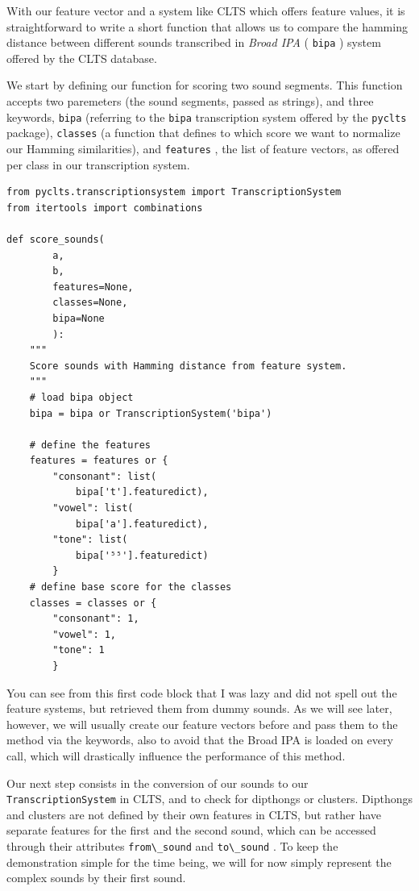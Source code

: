 \documentclass[
  a4paper,
  14pt,
  oneside,
  tablecaptionabove
]{scrbook}
\newcommand{\passthrough}[1]{#1}
\begin{document}
With our feature vector and a system like CLTS which offers feature
values, it is straightforward to write a short function that allows us
to compare the hamming distance between different sounds transcribed in
\emph{Broad IPA} ( \passthrough{\lstinline!bipa!} ) system offered by
the CLTS database.

We start by defining our function for scoring two sound segments. This
function accepts two paremeters (the sound segments, passed as strings),
and three keywords, \passthrough{\lstinline!bipa!} (referring to the
\passthrough{\lstinline!bipa!} transcription system offered by the
\passthrough{\lstinline!pyclts!} package),
\passthrough{\lstinline!classes!} (a function that defines to which
score we want to normalize our Hamming similarities), and
\passthrough{\lstinline!features!} , the list of feature vectors, as
offered per class in our transcription system.

\begin{lstlisting}
from pyclts.transcriptionsystem import TranscriptionSystem
from itertools import combinations

def score_sounds(
        a,
        b,
        features=None,
        classes=None,
        bipa=None
        ):
    """
    Score sounds with Hamming distance from feature system.
    """
    # load bipa object
    bipa = bipa or TranscriptionSystem('bipa')

    # define the features
    features = features or {
        "consonant": list(
            bipa['t'].featuredict),
        "vowel": list(
            bipa['a'].featuredict),
        "tone": list(
            bipa['⁵⁵'].featuredict)
        }
    # define base score for the classes
    classes = classes or {
        "consonant": 1,
        "vowel": 1,
        "tone": 1
        }
\end{lstlisting}

You can see from this first code block that I was lazy and did not spell
out the feature systems, but retrieved them from dummy sounds. As we
will see later, however, we will usually create our feature vectors
before and pass them to the method via the keywords, also to avoid that
the Broad IPA is loaded on every call, which will drastically influence
the performance of this method.

Our next step consists in the conversion of our sounds to our
\passthrough{\lstinline!TranscriptionSystem!} in CLTS, and to check for
dipthongs or clusters. Dipthongs and clusters are not defined by their
own features in CLTS, but rather have separate features for the first
and the second sound, which can be accessed through their attributes
\passthrough{\lstinline!from\_sound!} and
\passthrough{\lstinline!to\_sound!} . To keep the demonstration simple
for the time being, we will for now simply represent the complex sounds
by their first sound.
\end{document}
